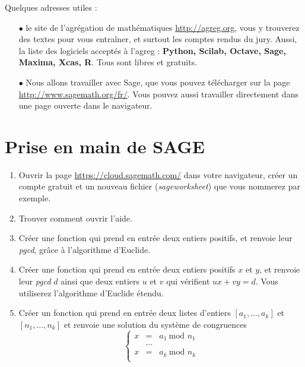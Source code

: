 Quelques adresses utiles :
\begin{itemize}
\item[$\bullet$]le site de l'agrégation de mathématiques \url{http://agreg.org}, vous y trouverez des textes pour vous entraîner, et surtout les comptes rendus du jury. Aussi, la liste des logiciels acceptés à l'agreg : \textbf{Python, Scilab, Octave, Sage, Maxima, Xcas, R}. Tous sont libres et gratuits.
\item[$\bullet$]Nous allons travailler avec Sage, que vous pouvez télécharger sur la page \url{http://www.sagemath.org/fr/}. Vous pouvez aussi travailler directement dans une page ouverte dans le navigateur.
\end{itemize}

\section{Prise en main de SAGE}

\begin{enumerate}
\item Ouvrir la page \url{https://cloud.sagemath.com/} dans votre navigateur, créer un compte gratuit et un nouveau fichier (\textit{sageworksheet}) que vous nommerez  par exemple.
\item Trouver comment ouvrir l'aide.
\item Créer une fonction qui prend en entrée deux entiers positifs, et renvoie leur \textit{pgcd}, grâce à l'algorithme d'Euclide.
\item Créer une fonction qui prend en entrée deux entiers positifs $x$ et $y$, et renvoie leur \textit{pgcd} $d$ ainsi que deux entiers $u$ et $v$ qui vérifient $ux+vy=d$. Vous utiliserez l'algorithme d'Euclide étendu.
\item Créer un fonction qui prend en entrée deux listes d'entiers $[a_1,...,a_k]$ et $[n_1,...,n_k]$ et renvoie une solution du système de congruences
\[\left\{\begin{array}{rcl}
 x & = & a_1 \ \text{mod }n_1\\
   &  ... & \\
 x & = & a_k \ \text{mod }n_k\\
\end{array}\right.\]

\end{enumerate}
